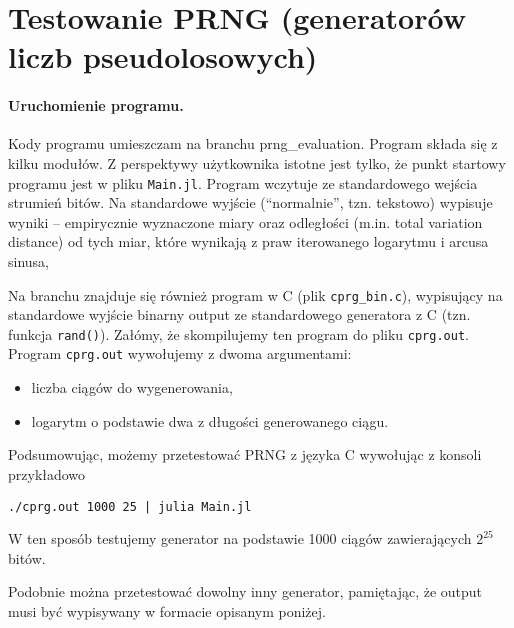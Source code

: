 \documentclass[a4paper, 10pt]{article}
\begin{document}
\section{Testowanie PRNG (generatorów liczb pseudolosowych)}

\paragraph{Uruchomienie programu.}
Kody programu umieszczam na branchu prng\_evaluation. Program składa się z kilku modułów.
Z perspektywy użytkownika istotne jest tylko, że punkt startowy programu jest w pliku \texttt{Main.jl}.
Program wczytuje ze standardowego wejścia strumień bitów. Na standardowe wyjście (``normalnie'', tzn. tekstowo)
wypisuje wyniki -- empirycznie wyznaczone miary oraz odległości (m.in. total variation distance) od tych miar, które wynikają z praw iterowanego logarytmu i arcusa sinusa,

Na branchu znajduje się również program w C (plik \texttt{cprg\_bin.c}), wypisujący na standardowe wyjście binarny output ze standardowego generatora z C (tzn. funkcja \texttt{rand()}). Załómy, że skompilujemy ten program do pliku \texttt{cprg.out}. Program \texttt{cprg.out} wywołujemy z dwoma argumentami:
\begin{itemize}
 \item liczba ciągów do wygenerowania,
 \item logarytm o podstawie dwa z długości generowanego ciągu.
\end{itemize}
Podsumowując, możemy przetestować PRNG z języka C wywołując z konsoli przykładowo

\texttt{./cprg.out 1000 25 | julia Main.jl}

\noindent W ten sposób testujemy generator na podstawie 1000 ciągów zawierających $2^{25}$ bitów.

Podobnie można przetestować dowolny inny generator, pamiętając, że output musi być wypisywany w formacie opisanym poniżej.
\end{document}
